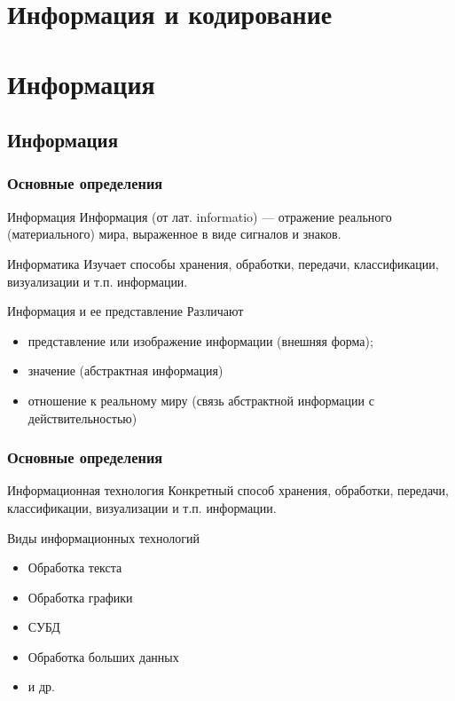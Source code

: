 \subtitle{Лекция 2 --- Информация и кодирование}
\frame[plain]
{\titlepage}	%

\section{Информация и кодирование}
\section{Информация}
 \subsection{Информация}
\begin{frame}
\frametitle{Основные определения}


\begin{block}{Информация}
  Информация (от лат. informatio) — отражение реального (материального) мира, выраженное в виде сигналов и знаков.

\end{block}

\pause

\begin{block}{Информатика}
Изучает способы хранения, обработки, передачи, классификации, визуализации и т.п. информации.
\end{block}
\pause
\begin{block}{Информация и ее представление}
Различают
 \begin{itemize}
 \item{представление или изображение информации (внешняя форма);}
 \item{значение (абстрактная информация)}
 \item{отношение к реальному миру (связь абстрактной информации с действительностью)}
 \end{itemize}
 
\end{block}

\end{frame}

\begin{frame}
\frametitle{Основные определения}
\begin{block}{Информационная технология}
Конкретный способ хранения, обработки, передачи, классификации, визуализации и т.п. информации.
\end{block}
\pause
\begin{block}{Виды информационных технологий}
\begin{itemize}
	\item Обработка текста
	\item Обработка графики
	\item СУБД
	\item Обработка больших данных
	\item и др.
\end{itemize}
\end{block}

\end{frame}

